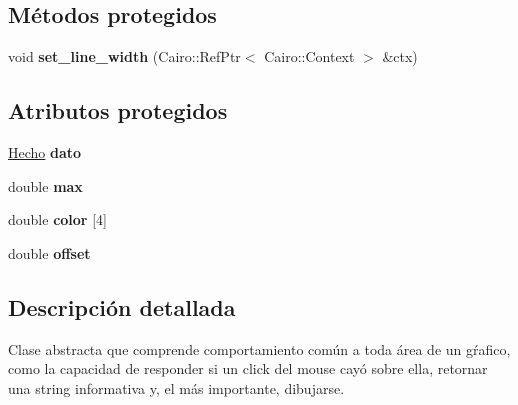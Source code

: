 \subsection*{\-Métodos protegidos}
\begin{DoxyCompactItemize}
\item 
\hypertarget{classArea_a0ca36f43b54962940236f35dd451999f}{void {\bfseries set\-\_\-line\-\_\-width} (\-Cairo\-::\-Ref\-Ptr$<$ \-Cairo\-::\-Context $>$ \&ctx)}\label{classArea_a0ca36f43b54962940236f35dd451999f}

\end{DoxyCompactItemize}
\subsection*{\-Atributos protegidos}
\begin{DoxyCompactItemize}
\item 
\hypertarget{classArea_ac254039e6cdfea6921e15ea66c3fa748}{\hyperlink{classHecho}{\-Hecho} {\bfseries dato}}\label{classArea_ac254039e6cdfea6921e15ea66c3fa748}

\item 
\hypertarget{classArea_aaec8b27b607b17ec509c35d4157271b5}{double {\bfseries max}}\label{classArea_aaec8b27b607b17ec509c35d4157271b5}

\item 
\hypertarget{classArea_a690c7dd341ef34aa9b81e9860732eba5}{double {\bfseries color} \mbox{[}4\mbox{]}}\label{classArea_a690c7dd341ef34aa9b81e9860732eba5}

\item 
\hypertarget{classArea_a22f6ce0774ab2cd976ab40edfdff67c9}{double {\bfseries offset}}\label{classArea_a22f6ce0774ab2cd976ab40edfdff67c9}

\end{DoxyCompactItemize}


\subsection{\-Descripción detallada}
\-Clase abstracta que comprende comportamiento común a toda área de un gŕafico, como la capacidad de responder si un click del mouse cayó sobre ella, retornar una string informativa y, el más importante, dibujarse. 

